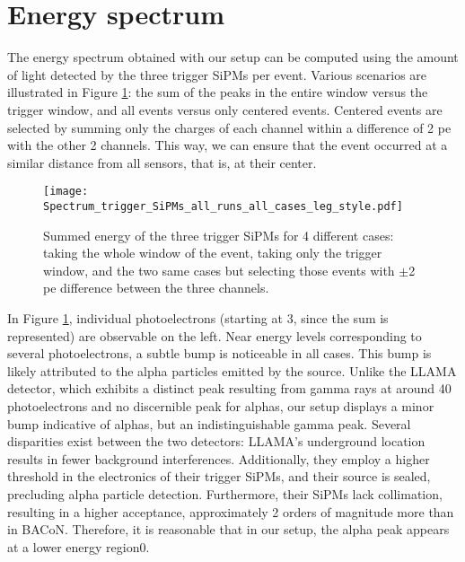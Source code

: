 \documentclass[11pt,a4paper,english,oneside, pdf]{article}
\begin{document}
	\section{Energy spectrum}
	
	The energy spectrum obtained with our setup can be computed using the amount of light detected by the three trigger SiPMs per event. Various scenarios are illustrated in Figure \ref{fig:Spectrum_trigger_SiPMs_all_runs_all_cases}: the sum of the peaks in the entire window versus the trigger window, and all events versus only centered events. Centered events are selected by summing only the charges of each channel within a difference of 2 pe with the other 2 channels. This way, we can ensure that the event occurred at a similar distance from all sensors, that is, at their center.
	
	\begin{figure}[!h]
		\begin{center}
			\texttt{[image: Spectrum\_trigger\_SiPMs\_all\_runs\_all\_cases\_leg\_style.pdf]}
			\caption{Summed energy of the three trigger SiPMs for 4 different cases: taking the whole window of the event, taking only the trigger window, and the two same cases but selecting those events with $\pm$2 pe difference between the three channels.}
			\label{fig:Spectrum_trigger_SiPMs_all_runs_all_cases}
		\end{center}
	\end{figure}
	
	In Figure \ref{fig:Spectrum_trigger_SiPMs_all_runs_all_cases}, individual photoelectrons (starting at 3, since the sum is represented) are observable on the left. Near energy levels corresponding to several photoelectrons, a subtle bump is noticeable in all cases. This bump is likely attributed to the alpha particles emitted by the source. Unlike the LLAMA detector, which exhibits a distinct peak resulting from gamma rays at around 40 photoelectrons and no discernible peak for alphas, our setup displays a minor bump indicative of alphas, but an indistinguishable gamma peak. Several disparities exist between the two detectors: LLAMA's underground location results in fewer background interferences. Additionally, they employ a higher threshold in the electronics of their trigger SiPMs, and their source is sealed, precluding alpha particle detection. Furthermore, their SiPMs lack collimation, resulting in a higher acceptance, approximately 2 orders of magnitude more than in BACoN. Therefore, it is reasonable that in our setup, the alpha peak appears at a lower energy region0.
\end{document}

